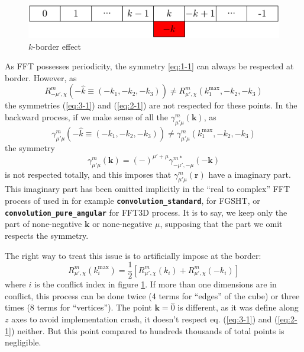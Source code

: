 \begin{figure}[h]
\begin{centering}
\includegraphics{_figure/k-border}
\par\end{centering}
\caption{$k$-border effect\label{fig:k-border-effect}}
\end{figure}

As \acs{FFT} possesses periodicity, the symmetry \ref{eq:1-1} can
always be respected at border. However, as
\begin{equation}
R_{-\mu',\chi}^{m}(-\hat{k}\equiv(-k_{1},-k_{2},-k_{3}))\neq R_{\mu',\chi}^{m}(k_{1}^{\mathrm{max}},-k_{2},-k_{3})
\end{equation}
the symmetries (\ref{eq:3-1}) and (\ref{eq:2-1}) are not respected
for these points. In the backward process, if we make sense of all
the $\gamma_{\mu'\mu}^{m}(\mathbf{k})$, as
\[
\gamma_{\mu'\mu}^{m}(-\hat{k}\equiv(-k_{1},-k_{2},-k_{3}))\neq\gamma_{\mu'\mu}^{m}(k_{1}^{\mathrm{max}},-k_{2},-k_{3})
\]
the symmetry
\begin{equation}
\gamma_{\mu'\mu}^{m}(\mathbf{k})=(-)^{\mu'+\mu}\gamma_{-\mu',-\mu}^{m*}(-\mathbf{k})\label{eq:1-1}
\end{equation}
is not respected totally, and this imposes that $\gamma_{\mu'\mu}^{m}(\mathbf{r})$
have a imaginary part. This imaginary part has been omitted implicitly
in the ``real to complex'' \acs{FFT} process of used in for example
\texttt{\textbf{convolution\_standard}}, for \acs{FGSHT}, or \texttt{\textbf{convolution\_pure\_angular}}
for FFT3D process. It is to say, we keep only the part of none-negative
$\mathbf{k}$ or none-negative $\mu$, supposing that the part we
omit respects the symmetry.

The right way to treat this issue is to artificially impose at the
border:
\begin{equation}
R_{\mu',\chi}^{m}(k_{i}^{\mathrm{max}})=\frac{1}{2}\left[R_{\mu',\chi}^{m}(k_{i})+R_{\mu',\chi}^{m}(-k_{i})\right]
\end{equation}
where $i$ is the conflict index in figure \ref{fig:k-border-effect}.
If more than one dimensions are in conflict, this process can be done
twice (4 terms for ``edges'' of the cube) or three times (8 terms
for ``vertices''). The point $\mathbf{k}=\hat{0}$ is different,
as it was define along $z$ axes to avoid implementation crash, it
doesn't respect eq. (\ref{eq:3-1}) and (\ref{eq:2-1}) neither. But
this point compared to hundreds thousands of total points is negligible.

